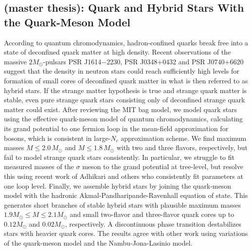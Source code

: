 \subsection*{ (master thesis): Quark and Hybrid Stars With the Quark-Meson Model}

According to quantum chromodynamics,
hadron-confined quarks break free into a state of deconfined quark matter at high density.
Recent observations of the massive $2 M_\odot$-pulsars PSR J1614$-$2230, PSR J0348$+$0432 and PSR J0740$+$6620
suggest that the density in neutron stars could reach sufficiently high levels
for formation of small cores of deconfined quark matter in what is then referred to as hybrid stars.
If the strange matter hypothesis is true and strange quark matter is stable,
even pure strange quark stars consisting only of deconfined strange quark matter could exist.
After reviewing the MIT bag model,
we model quark stars using the effective quark-meson model of quantum chromodynamics,
calculating its grand potential to one fermion loop in the mean-field approximation for bosons,
which is consistent in large-$N_c$ approximation scheme.
We find maximum masses $M \leq 2.0 \, M_\odot$ and $M \leq 1.8 \, M_\odot$ with two and three flavors, respectively,
but fail to model strange quark stars consistently.
In particular, we struggle to fit measured masses 
of the $\sigma$ meson to the grand potential at tree-level,
but resolve this using recent work of Adhikari and others who consistently fit parameters at one loop level.
Finally, we assemble hybrid stars by joining the quark-meson model with the hadronic Akmal-Pandharipande-Ravenhall equation of state.
This generates short branches of stable hybrid stars with plausible maximum masses $1.9 M_\odot \leq M \leq 2.1 M_\odot$
and small two-flavor and three-flavor quark cores up to $0.12 M_\odot$ and $0.02 M_\odot$, respectively.
A discontinuous phase transition destabilizes stars with heavier quark cores.
The results agree with other work using variations of the quark-meson model and the Nambu-Jona-Lasinio model.%
\tikzexternaldisable%
%
\tikzexternalenable%



